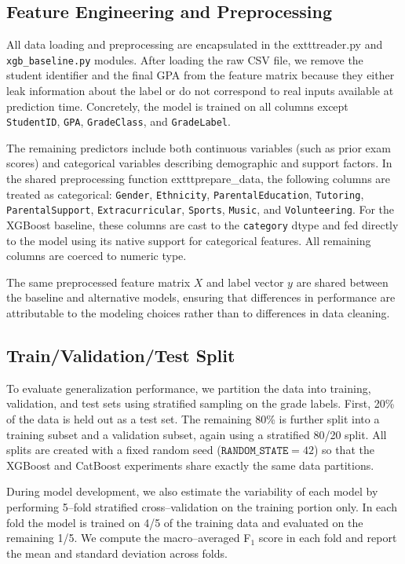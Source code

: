 \documentclass[11pt]{article}
\begin{document}
\subsection{Feature Engineering and Preprocessing}

All data loading and preprocessing are encapsulated in the
	exttt{reader.py} and \texttt{xgb\_baseline.py} modules.  After
loading the raw CSV file, we remove the student identifier and the
final GPA from the feature matrix because they either leak information
about the label or do not correspond to real inputs available at
prediction time.  Concretely, the model is trained on all columns
except \texttt{StudentID}, \texttt{GPA}, \texttt{GradeClass}, and
	\texttt{GradeLabel}.

The remaining predictors include both continuous variables (such as
prior exam scores) and categorical variables describing demographic
and support factors.  In the shared preprocessing function
	exttt{prepare\_data}, the following columns are treated as
categorical: \texttt{Gender}, \texttt{Ethnicity},
	\texttt{ParentalEducation}, \texttt{Tutoring},
	\texttt{ParentalSupport}, \texttt{Extracurricular}, \texttt{Sports},
	\texttt{Music}, and \texttt{Volunteering}.  For the XGBoost
baseline, these columns are cast to the \texttt{category} dtype and
fed directly to the model using its native support for categorical
features.  All remaining columns are coerced to numeric type.

The same preprocessed feature matrix $X$ and label vector $y$ are
shared between the baseline and alternative models, ensuring that
differences in performance are attributable to the modeling choices
rather than to differences in data cleaning.

\subsection{Train/Validation/Test Split}

To evaluate generalization performance, we partition the data into
training, validation, and test sets using stratified sampling on the
grade labels.  First, 20\% of the data is held out as a test set.
The remaining 80\% is further split into a training subset and a
validation subset, again using a stratified 80/20 split.  All splits
are created with a fixed random seed ($\texttt{RANDOM\_STATE} = 42$)
so that the XGBoost and CatBoost experiments share exactly the same
data partitions.

During model development, we also estimate the variability of each
model by performing 5--fold stratified cross--validation on the
training portion only.  In each fold the model is trained on 4/5 of
the training data and evaluated on the remaining 1/5.  We compute the
macro--averaged F$_1$ score in each fold and report the mean and
standard deviation across folds.
\end{document}
